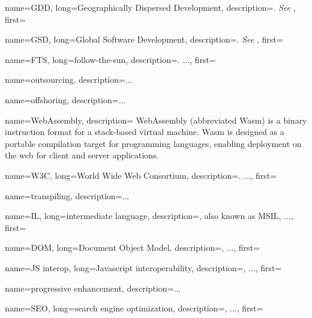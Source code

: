 {
    name=GDD,
    long={Geographically Dispersed Development},
    description={. \textit{See} },
    first=
}

{
    name=GSD,
    long={Global Software Development},
    description={. \textit{See} },
    first=
}

{
    name=FTS,
    long={follow-the-sun},
    description={. ...}, %
    first=
}

{
    name=outsourcing, 
    description={...} %
}

{
    name=offshoring, 
    description={...} %
}

{
    name=WebAssembly, 
    description={
        WebAssembly (abbreviated Wasm) is a binary instruction format for a
        stack-based virtual machine. Wasm is designed as a portable compilation
        target for programming languages, enabling deployment on the web for client
        and server applications.\autocite{Webassembly_2021}
    }
}

{
    name=W3C,
    long={World Wide Web Consortium},
    description={. ...},%
    first=
}

{
    name=transpiling, 
    description={...} %
}

{
    name=IL,
    long={intermediate language},
    description={, also known as MSIL, ...},%
    first=
}

{
    name=DOM,
    long={Document Object Model},
    description={, ...},%
    first=
}

{
    name={JS interop},
    long={Javascript interoperability},
    description={, ...},%
    first=
}

{
    name={progressive enhancement},
    description={...}%
}

{
    name=SEO,
    long={search engine optimization},
    description={, ...},%
    first=
}

